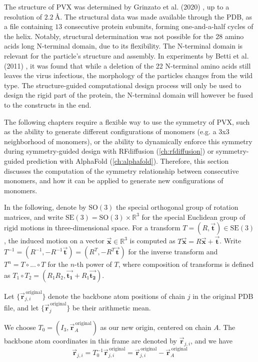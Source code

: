 The structure of PVX was determined by Grinzato et al. (2020) \cite{Grinzato2020}, up to a resolution of $\SI{2.2}{\angstrom}$. The structural data was made available through the PDB, as a file containing $13$ consecutive protein subunits, forming one-and-a-half cycles of the helix. Notably, structural determination was not possible for the 28 amino acids long N-terminal domain, due to its flexibility. The N-terminal domain is relevant for the particle's structure and assembly. In experiments by Betti et al. (2011) \cite{del22_rigid}, it was found that while a deletion of the 22 N-terminal amino acids still leaves the virus infectious, the morphology of the particles changes from the wild type. The structure-guided computational design process will only be used to design the rigid part of the protein, the N-terminal domain will however be fused to the constructs in the end. 

The following chapters require a flexible way to use the symmetry of PVX, such as the ability to generate different configurations of monomers (e.g. a 3x3 neighborhood of monomers), or the ability to dynamically enforce this symmetry during symmetry-guided design with RFdiffusion (\autoref{ch:rfdiffusion}) or symmetry-guided prediction with AlphaFold (\autoref{ch:alphafold}). Therefore, this section discusses the computation of the symmetry relationship between consecutive monomers, and how it can be applied to generate new configurations of monomers.

In the following, denote by $\mathrm{SO}(3)$ the special orthogonal group of rotation matrices, and write $\mathrm{SE}(3) = \mathrm{SO}(3)\times \mathbb{R}^3$ for the special Euclidean group of rigid motions in three-dimensional space. For a transform $T = (R, \vec{\mathbf{t}}) \in \mathrm{SE(3)}$, the induced motion on a vector $\vec{\mathbf{x}} \in \mathbb{R}^3$ is computed as $T\vec{\mathbf{x}} = R\vec{\mathbf{x}} + \vec{\mathbf{t}}$. Write $T^{-1} = (R^{-1}, -R^{-1}\vec{\mathbf{t}}) = (R^T, -R^T \vec{\mathbf{t}})$ for the inverse transform and $T^n = T\circ ... \circ T$ for the $n$-th power of $T$, where composition of transforms is defined as $T_1\circ T_2 = (R_1R_2, \vec{\mathbf{t_1}} + R_1\vec{\mathbf{t_2}})$. 

Let $\{\vec{\mathbf{r}}_{j,i}^{\,\text{original}}\}$ denote the backbone atom positions of chain $j$ in the original PDB file, and let $\{\vec{\mathbf{r}}_{j}^{\,\text{original}}\}$ be their arithmetic mean. 

We choose $T_0 = (I_3, \vec{\mathbf{r}}_A^{\,\text{original}})$ as our new origin, centered on chain $A$. The backbone atom coordinates in this frame are denoted by $\vec{\mathbf{r}}_{j,i}$, and we have
\begin{equation}
    \vec{\mathbf{r}}_{j,i} = T_0^{-1} \vec{\mathbf{r}}_{j,i}^{\,\text{original}} = \vec{\mathbf{r}}_{j,i}^{\,\text{original}} - \vec{\mathbf{r}}_{A}^{\,\text{original}}
\end{equation}

